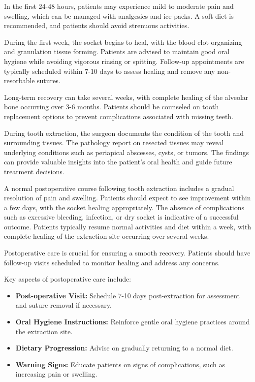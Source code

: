 In the first 24-48 hours, patients may experience mild to moderate pain and swelling, which can be managed with analgesics and ice packs. A soft diet is recommended, and patients should avoid strenuous activities. 

During the first week, the socket begins to heal, with the blood clot organizing and granulation tissue forming. Patients are advised to maintain good oral hygiene while avoiding vigorous rinsing or spitting. Follow-up appointments are typically scheduled within 7-10 days to assess healing and remove any non-resorbable sutures.

Long-term recovery can take several weeks, with complete healing of the alveolar bone occurring over 3-6 months. Patients should be counseled on tooth replacement options to prevent complications associated with missing teeth.

During tooth extraction, the surgeon documents the condition of the tooth and surrounding tissues. The pathology report on resected tissues may reveal underlying conditions such as periapical abscesses, cysts, or tumors. The findings can provide valuable insights into the patient's oral health and guide future treatment decisions.

A normal postoperative course following tooth extraction includes a gradual resolution of pain and swelling. Patients should expect to see improvement within a few days, with the socket healing appropriately. The absence of complications such as excessive bleeding, infection, or dry socket is indicative of a successful outcome. Patients typically resume normal activities and diet within a week, with complete healing of the extraction site occurring over several weeks.

Postoperative care is crucial for ensuring a smooth recovery. Patients should have follow-up visits scheduled to monitor healing and address any concerns. 

Key aspects of postoperative care include:

\begin{itemize}
  \item \textbf{Post-operative Visit:} Schedule 7-10 days post-extraction for assessment and suture removal if necessary.
  \item \textbf{Oral Hygiene Instructions:} Reinforce gentle oral hygiene practices around the extraction site.
  \item \textbf{Dietary Progression:} Advise on gradually returning to a normal diet.
  \item \textbf{Warning Signs:} Educate patients on signs of complications, such as increasing pain or swelling.
\end{itemize}

